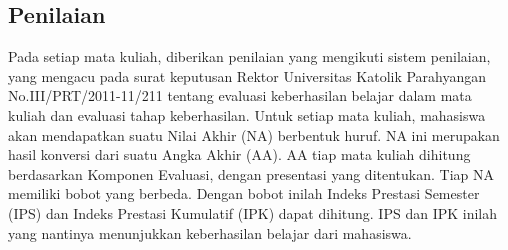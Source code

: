 \subsection{Penilaian}

Pada setiap mata kuliah, diberikan penilaian yang mengikuti sistem penilaian, yang mengacu pada surat keputusan Rektor Universitas Katolik Parahyangan No.III/PRT/2011-11/211 tentang evaluasi keberhasilan belajar dalam mata kuliah dan evaluasi tahap keberhasilan. Untuk setiap mata kuliah, mahasiswa akan mendapatkan suatu Nilai Akhir (NA) berbentuk huruf. NA ini merupakan hasil konversi dari suatu Angka Akhir (AA). AA tiap mata kuliah dihitung berdasarkan Komponen Evaluasi, dengan presentasi yang ditentukan. Tiap NA memiliki bobot yang berbeda. Dengan bobot inilah Indeks Prestasi Semester (IPS) dan Indeks Prestasi Kumulatif (IPK) dapat dihitung. IPS dan IPK inilah yang nantinya menunjukkan keberhasilan belajar dari mahasiswa.

